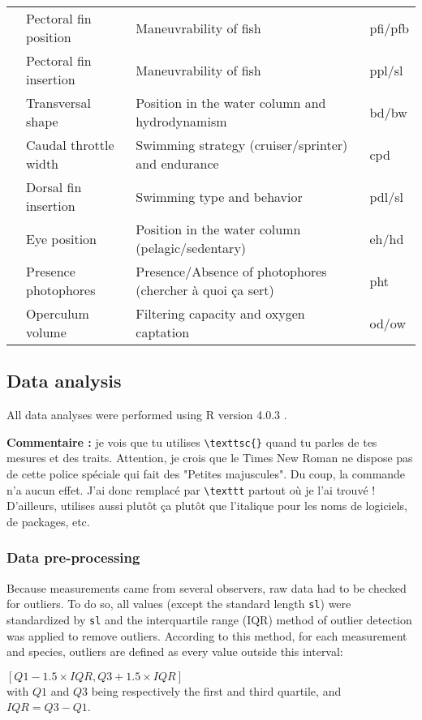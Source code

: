 \begin{sidewaystable}
\begin{tabular}{>{\bfseries}llll}
  &Pectoral fin position & Maneuvrability of fish & pfi/pfb \\ 
  &Pectoral fin insertion & Maneuvrability of fish & ppl/sl \\ 
  &Transversal shape & Position in the water column and hydrodynamism & bd/bw \\ 
  &Caudal throttle width & Swimming strategy (cruiser/sprinter) and endurance & cpd \\ 
  &Dorsal fin insertion & Swimming type and behavior & pdl/sl \\ 
\midrule
  \multirow{2}{*}{Habitat} &Eye position & Position in the water column (pelagic/sedentary) & eh/hd \\ 
  &Presence photophores & Presence/Absence of photophores (chercher à quoi ça sert) & pht \\ 
  &Operculum volume & Filtering capacity and oxygen captation & od/ow \\ 
\bottomrule
\end{tabular}
\end{sidewaystable}

\subsection{Data analysis}
All data analyses were performed using \textsf{R} version 4.0.3 \citep{rcoreteam2021}.

\textbf{Commentaire : } je vois que tu utilises \verb;\texttsc{}; quand tu parles de tes mesures et des traits. Attention, je crois que le Times New Roman ne dispose pas de cette police spéciale qui fait des "Petites majuscules". Du coup, la commande n'a aucun effet. J'ai donc remplacé par \verb;\texttt; partout où je l'ai trouvé ! D'ailleurs, utilises aussi plutôt ça plutôt que l'italique pour les noms de logiciels, de packages, etc.

\subsubsection{Data pre-processing}
Because measurements came from several observers, raw data had to be checked for outliers. To do so, all values (except the standard length \texttt{sl}) were standardized by \texttt{sl} and the interquartile range (IQR) method of outlier detection was applied to remove outliers. According to this method, for each measurement and species, outliers are defined as every value outside this interval: 
\begin{center}
$ [Q1 - 1.5 \times IQR, Q3 + 1.5 \times IQR]$ \\
with $Q1$ and $Q3$ being respectively the first and third quartile, and $IQR = Q3 - Q1$. 
\end{center}{}

